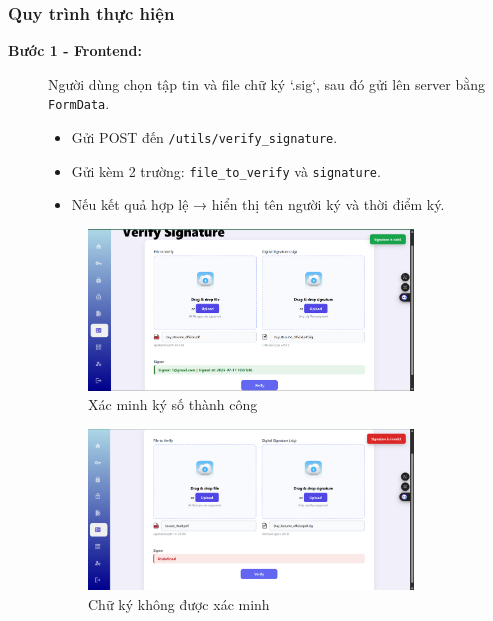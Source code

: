 \subsubsection*{Quy trình thực hiện}

\begin{description}
    \item[\textbf{Bước 1 - Frontend:}] Người dùng chọn tập tin và file chữ ký `.sig`, sau đó gửi lên server bằng \texttt{FormData}.
    \begin{itemize}
        \item Gửi POST đến \texttt{/utils/verify\_signature}.
        \item Gửi kèm 2 trường: \texttt{file\_to\_verify} và \texttt{signature}.
        \item Nếu kết quả hợp lệ → hiển thị tên người ký và thời điểm ký.
    \end{itemize}

    \begin{figure}[H]
        \centering
        \includegraphics[width=0.85\textwidth]{img/9_verify/9_verify_success.png}
        \caption{Xác minh ký số thành công}
    \end{figure}

    \begin{figure}[H]
        \centering
        \includegraphics[width=0.85\textwidth]{img/9_verify/9_verify_invalid.png}
        \caption{Chữ ký không được xác minh}
    \end{figure}


\end{description}
